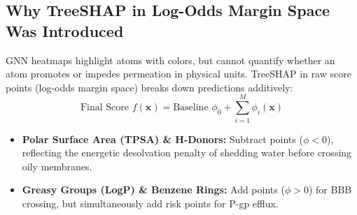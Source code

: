 \documentclass[11pt,a4paper]{article}
\begin{document}
\begin{mathspecbox}
\subsection{Why TreeSHAP in Log-Odds Margin Space Was Introduced}
GNN heatmaps highlight atoms with colors, but cannot quantify whether an atom promotes or impedes permeation in physical units. TreeSHAP in raw score points (log-odds margin space) breaks down predictions additively:
\begin{equation}
\text{Final Score } f(\mathbf{x}) = \text{Baseline } \phi_0 + \sum_{i=1}^M \phi_i(\mathbf{x})
\end{equation}
\begin{itemize}[leftmargin=*]
    \item \textbf{Polar Surface Area (TPSA) \& H-Donors:} Subtract points ($\phi < 0$), reflecting the energetic desolvation penalty of shedding water before crossing oily membranes.
    \item \textbf{Greasy Groups (LogP) \& Benzene Rings:} Add points ($\phi > 0$) for BBB crossing, but simultaneously add risk points for P-gp efflux.
\end{itemize}
\end{mathspecbox}
\end{document}
